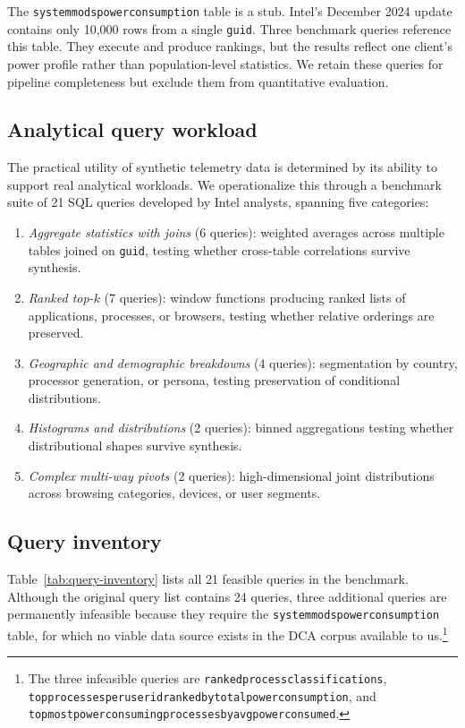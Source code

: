 \documentclass[12pt,letterpaper]{article}
\renewcommand{\_}{\textunderscore\allowbreak}
\begin{document}
The \texttt{system\_mods\_power\_consumption} table is a stub. Intel's December 2024 update contains only 10{,}000 rows from a single \texttt{guid}. Three benchmark queries reference this table. They execute and produce rankings, but the results reflect one client's power profile rather than population-level statistics. We retain these queries for pipeline completeness but exclude them from quantitative evaluation.

\subsection{Analytical query workload}

The practical utility of synthetic telemetry data is determined by its ability to support real analytical workloads. We operationalize this through a benchmark suite of 21 SQL queries developed by Intel analysts, spanning five categories:

\begin{enumerate}
    \item \textit{Aggregate statistics with joins} (6 queries): weighted averages across multiple tables joined on \texttt{guid}, testing whether cross-table correlations survive synthesis.
    \item \textit{Ranked top-$k$} (7 queries): window functions producing ranked lists of applications, processes, or browsers, testing whether relative orderings are preserved.
    \item \textit{Geographic and demographic breakdowns} (4 queries): segmentation by country, processor generation, or persona, testing preservation of conditional distributions.
    \item \textit{Histograms and distributions} (2 queries): binned aggregations testing whether distributional shapes survive synthesis.
    \item \textit{Complex multi-way pivots} (2 queries): high-dimensional joint distributions across browsing categories, devices, or user segments.
\end{enumerate}

\subsection{Query inventory}

Table~\ref{tab:query-inventory} lists all 21 feasible queries in the benchmark. Although the original query list contains 24 queries, three additional queries are permanently infeasible because they require the \texttt{system\_mods\_power\_consumption} table, for which no viable data source exists in the DCA corpus available to us.\footnote{The three infeasible queries are \texttt{ranked\_process\_classifications}, \texttt{top\_10\_processes\_per\_user\_id\_ranked\_by\_total\_power\_consumption}, and \texttt{top\_20\_most\_power\_consuming\_processes\_by\_avg\_power\_consumed}.}
\end{document}
